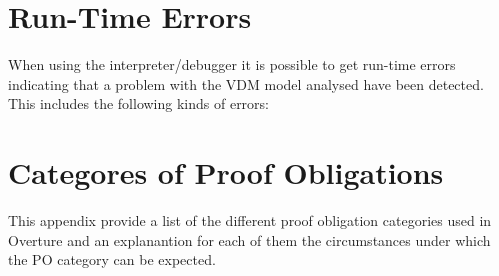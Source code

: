 \documentclass{overturerepchap}
\begin{document}
\newpage
\chapter{Run-Time Errors}\label{app:runtimeerr}

When using the interpreter/debugger it is possible to get run-time
errors indicating that a problem with the VDM model analysed have been
detected. This includes the following kinds of errors:



\newpage
\chapter{Categores of Proof Obligations}\label{app:POcategories}

This appendix provide a list of the different proof obligation
categories used in Overture and an explanantion for each of them the
circumstances under which the PO category can be expected.
\end{document}
